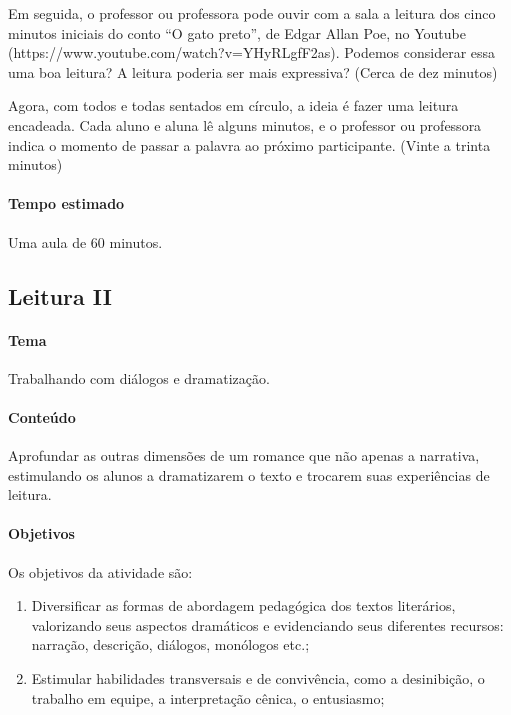 \documentclass[12pt]{extarticle}
\begin{document}
{Em seguida, o professor ou professora pode ouvir com a sala a leitura
dos cinco minutos iniciais do conto ``O gato preto'', de Edgar Allan
Poe, no Youtube (https://www.youtube.com/watch?v=YHyRLgfF2as). Podemos
considerar essa uma boa leitura? A leitura poderia ser mais expressiva?
(Cerca de dez minutos)

Agora, com todos e todas sentados em círculo, a ideia é fazer uma
leitura encadeada. Cada aluno e aluna lê alguns minutos, e o professor
ou professora indica o momento de passar a palavra ao próximo
participante.
(Vinte a trinta minutos)

\paragraph{Tempo estimado} Uma aula de 60 minutos.

\subsection{Leitura II}

\paragraph{Tema} Trabalhando com diálogos e dramatização.


\paragraph{Conteúdo} Aprofundar as outras dimensões de um romance que não apenas a narrativa, estimulando os alunos a dramatizarem o texto e trocarem suas experiências de leitura.

\paragraph{Objetivos}
Os objetivos da atividade são:
\begin{enumerate}
\item
Diversificar as formas de abordagem
pedagógica dos textos literários, valorizando seus aspectos dramáticos e
evidenciando seus diferentes recursos: narração, descrição, diálogos,
monólogos etc.; 

\item
Estimular habilidades transversais e de convivência,
como a desinibição, o trabalho em equipe, a interpretação cênica, o
entusiasmo;


\end{enumerate}}
\end{document}
